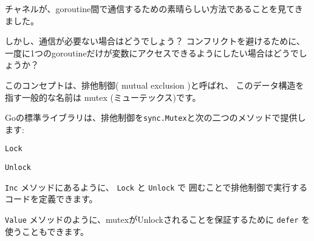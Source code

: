 チャネルが、goroutine間で通信するための素晴らしい方法であることを見てきました。

しかし、通信が必要ない場合はどうでしょう？ コンフリクトを避けるために、
一度に1つのgoroutineだけが変数にアクセスできるようにしたい場合はどうでしょうか？

このコンセプトは、排他制御( mutual exclusion )と呼ばれ、
このデータ構造を指す一般的な名前は mutex (ミューテックス)です。

Goの標準ライブラリは、排他制御を\texttt{sync.Mutex}と次の二つのメソッドで提供します:
\begin{description}
\item \texttt{Lock}
\item \texttt{Unlock}
\end{description}
\texttt{Inc} メソッドにあるように、 \texttt{Lock} と \texttt{Unlock} で
囲むことで排他制御で実行するコードを定義できます。

\texttt{Value} メソッドのように、mutexがUnlockされることを保証するために
\texttt{defer} を使うこともできます。